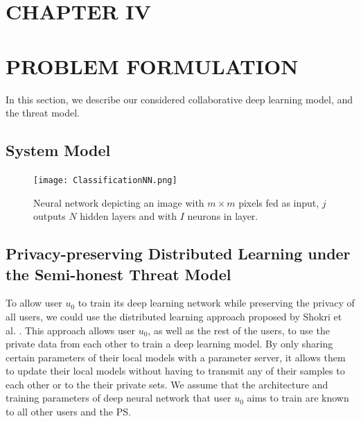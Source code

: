 \documentclass[letterpaper]{article}
\begin{document}
\begin{flushleft}
{\pagebreak
\section*{CHAPTER IV}
\vspace{0.25in}
\section{PROBLEM FORMULATION}

In this section, we describe our considered collaborative deep learning model, and the threat model. 

\subsection{System Model} \label{sec:systemModel}
\begin{figure}[H]
  \centering
    \texttt{[image: ClassificationNN.png]}
    \caption[A simple neural network.]{\label{fig:ClassNN} Neural network depicting an image with $m \times m$ pixels fed as input, $j$ outputs  $N$  hidden layers and with $I$ neurons in layer.}
  \end{figure}


\subsection{Privacy-preserving Distributed Learning under the Semi-honest Threat Model}
To allow user $u_0$ to train its deep learning network while preserving the privacy of all users, we could use the distributed
learning approach proposed by Shokri et al. \cite{shokri2015privacy}. This approach allows user $u_0$, as well as the rest of the users, 
to use the private data from each other to train a deep learning model. By only sharing certain parameters of their local models
with a parameter server, it allows them to update their local models without having to transmit any of their samples to each other
or to the their private sets. We assume that the architecture and training parameters of  deep neural network that user $u_0$ aims to
train are known  to all other users and the PS.


}
\end{flushleft}
\end{document}
